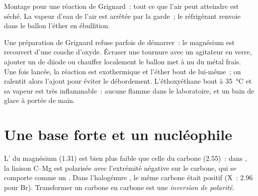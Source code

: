 \begin{omfigure}

{\small Montage pour une réaction de Grignard~: tout ce que l'air peut
atteindre est séché. La vapeur d'eau de l'air est arrêtée par la garde~;
le réfrigérant renvoie dans le ballon l'éther en ébullition.}
\end{omfigure}

\begin{inthelab}
Une préparation de Grignard refuse parfois de démarrer~: le magnésium est
recouvert d'une couche d'oxyde. Écraser une tournure avec un agitateur
en verre, ajouter un  de diiode ou chauffer localement le ballon
met à nu du métal frais. Une fois lancée, la réaction est exothermique et
l'éther bout de lui-même~; on ralentit alors l'ajout pour éviter le
débordement. L'éthoxyéthane bout à \qty{35}{\celsius} et sa vapeur est
très inflammable~: aucune flamme dans le laboratoire, et un bain de glace
à portée de main.
\end{inthelab}

\section{Une base forte et un nucléophile}

\begin{definition}\label{def:b1:organomagnesium:umpolung}
L' du magnésium (1.31) est bien plus faible que celle
du carbone (2.55)~: dans , la liaison C--Mg est polarisée avec
l'extrémité négative sur le carbone, qui se comporte comme un
. Dans l'halogénure , le même carbone était positif
(X~: 2.96 pour Br). Transformer un carbone  en carbone
 est une \emph{inversion de polarité}.
\end{definition}

